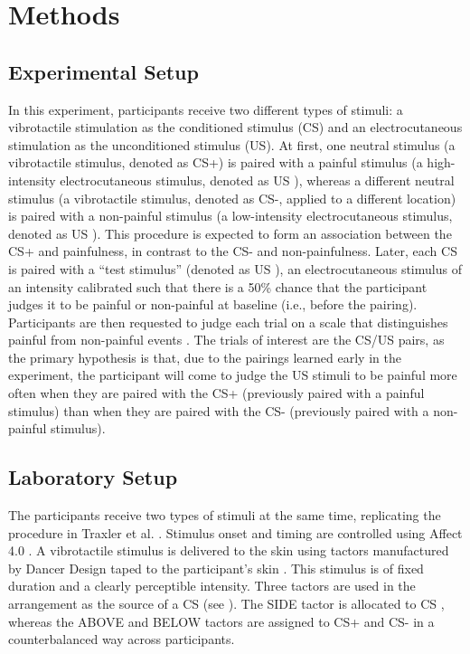 \documentclass{article}
\begin{document}
\section{Methods} 

\subsection{Experimental Setup} 

In this experiment, participants receive two different types of stimuli: a vibrotactile stimulation as the conditioned stimulus (CS) and an electrocutaneous stimulation as the unconditioned stimulus (US). At first, one neutral stimulus (a vibrotactile stimulus, denoted as CS+) is paired with a painful stimulus (a high-intensity electrocutaneous stimulus, denoted as US  ), whereas a different neutral stimulus (a vibrotactile stimulus, denoted as CS-, applied to a different location) is paired with a non-painful stimulus (a low-intensity electrocutaneous stimulus, denoted as US  ). This procedure is expected to form an association between the CS+ and painfulness, in contrast to the CS- and non-painfulness. Later, each CS is paired with a “test stimulus” (denoted as US  ), an electrocutaneous stimulus of an intensity calibrated such that there is a 50\% chance that the participant judges it to be painful or non-painful at baseline (i.e., before the pairing). Participants are then requested to judge each trial on a scale that distinguishes painful from non-painful events \autocite{bib40} . The trials of interest are the CS/US  pairs, as the primary hypothesis is that, due to the pairings learned early in the experiment, the participant will come to judge the US  stimuli to be painful more often when they are paired with the CS+ (previously paired with a painful stimulus) than when they are paired with the CS- (previously paired with a non-painful stimulus). 

\subsection{Laboratory Setup} 

The participants receive two types of stimuli at the same time, replicating the procedure in Traxler et al. \autocite{bib7} . Stimulus onset and timing are controlled using Affect 4.0 \autocite{bib41} . A vibrotactile stimulus is delivered to the skin using tactors manufactured by Dancer Design taped to the participant's skin \autocite{bib42} . This stimulus is of fixed duration and a clearly perceptible intensity. Three tactors are used in the arrangement as the source of a CS (see \autocite{bibFigure 1} ). The SIDE tactor is allocated to CS  , whereas the ABOVE and BELOW tactors are assigned to CS+ and CS- in a counterbalanced way across participants. 
\end{document}
